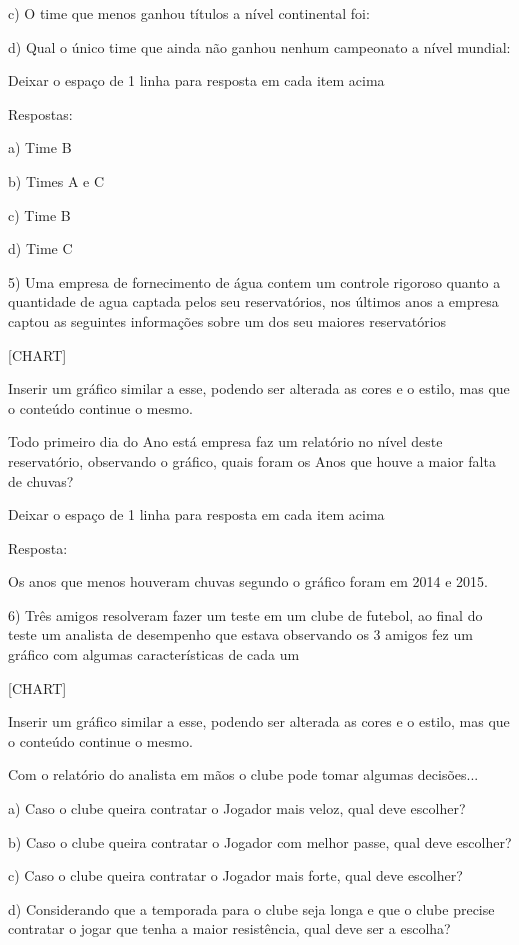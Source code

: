 c) O time que menos ganhou títulos a nível continental foi:

d) Qual o único time que ainda não ganhou nenhum campeonato a nível
mundial:

Deixar o espaço de 1 linha para resposta em cada item acima

Respostas:

a) Time B

b) Times A e C

c) Time B

d) Time C

5) Uma empresa de fornecimento de água contem um controle rigoroso
quanto a quantidade de agua captada pelos seu reservatórios, nos últimos
anos a empresa captou as seguintes informações sobre um dos seu maiores
reservatórios

{{[}CHART{]}}

Inserir um gráfico similar a esse, podendo ser alterada as cores e o
estilo, mas que o conteúdo continue o mesmo.

Todo primeiro dia do Ano está empresa faz um relatório no nível deste
reservatório, observando o gráfico, quais foram os Anos que houve a
maior falta de chuvas?

Deixar o espaço de 1 linha para resposta em cada item acima

Resposta:

Os anos que menos houveram chuvas segundo o gráfico foram em 2014 e
2015.

6) Três amigos resolveram fazer um teste em um clube de futebol, ao
final do teste um analista de desempenho que estava observando os 3
amigos fez um gráfico com algumas características de cada um

{{[}CHART{]}}

Inserir um gráfico similar a esse, podendo ser alterada as cores e o
estilo, mas que o conteúdo continue o mesmo.

Com o relatório do analista em mãos o clube pode tomar algumas
decisões...

a) Caso o clube queira contratar o Jogador mais veloz, qual deve
escolher?

b) Caso o clube queira contratar o Jogador com melhor passe, qual deve
escolher?

c) Caso o clube queira contratar o Jogador mais forte, qual deve
escolher?

d) Considerando que a temporada para o clube seja longa e que o clube
precise contratar o jogar que tenha a maior resistência, qual deve ser a
escolha?


